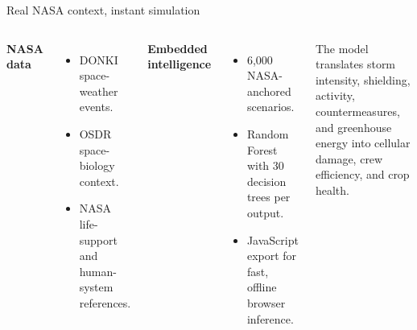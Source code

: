 \documentclass[aspectratio=169,11pt]{beamer}
\begin{document}
\begin{frame}{Real NASA context, instant simulation}
  \begin{columns}[T,onlytextwidth]
      \textbf{NASA data}
      \begin{itemize}
        \item DONKI space-weather events.
        \item OSDR space-biology context.
        \item NASA life-support and human-system references.
      \end{itemize}

      \medskip
      \textbf{Embedded intelligence}
      \begin{itemize}
        \item 6,000 NASA-anchored scenarios.
        \item Random Forest with 30 decision trees per output.
        \item JavaScript export for fast, offline browser inference.
      \end{itemize}
      \begin{center}

        \medskip
        \small
        The model translates storm intensity, shielding, activity,
        countermeasures, and greenhouse energy into cellular damage,
        crew efficiency, and crop health.
      \end{center}
  \end{columns}
\end{frame}
\end{document}
